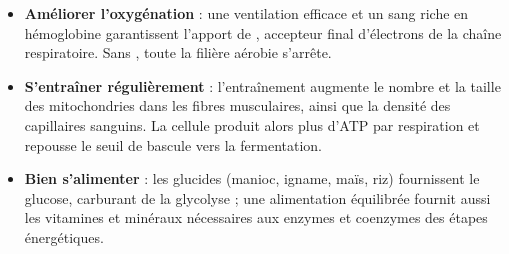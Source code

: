 \documentclass[11pt]{article}
\begin{document}
\begin{itemize}
\item \textbf{Améliorer l'oxygénation} : une ventilation efficace et un sang riche en hémoglobine garantissent l'apport de , accepteur final d'électrons de la chaîne respiratoire. Sans , toute la filière aérobie s'arrête.
\item \textbf{S'entraîner régulièrement} : l'entraînement augmente le nombre et la taille des mitochondries dans les fibres musculaires, ainsi que la densité des capillaires sanguins. La cellule produit alors plus d'ATP par respiration et repousse le seuil de bascule vers la fermentation.
\item \textbf{Bien s'alimenter} : les glucides (manioc, igname, maïs, riz) fournissent le glucose, carburant de la glycolyse ; une alimentation équilibrée fournit aussi les vitamines et minéraux nécessaires aux enzymes et coenzymes des étapes énergétiques.
\end{itemize}
\end{document}
